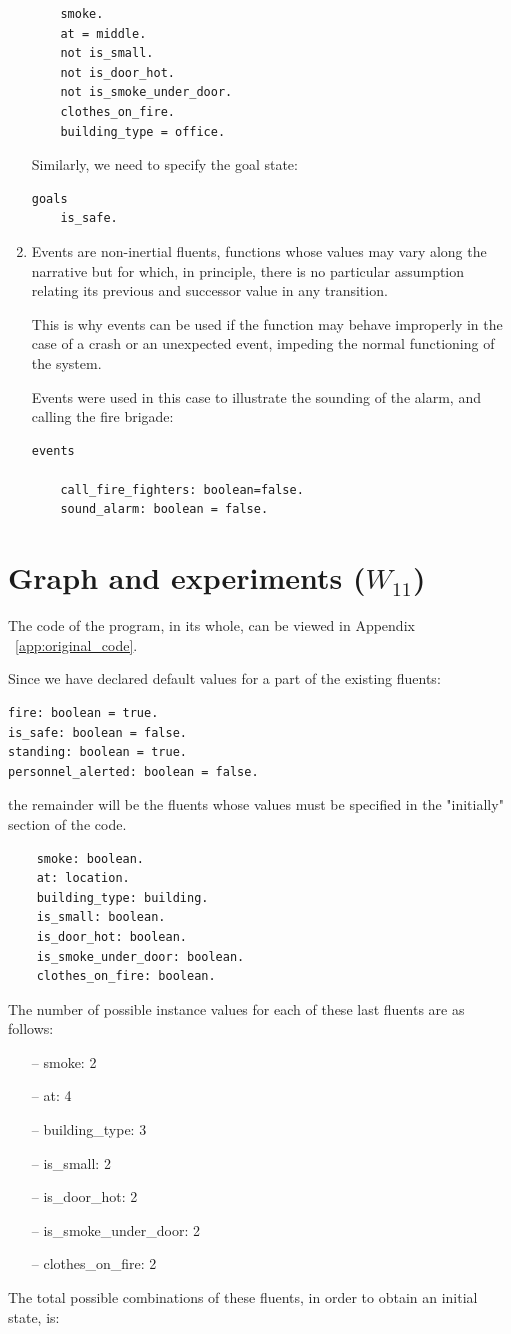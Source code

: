 \documentclass[a4paper,12pt]{report}
\begin{document}
\begin{enumerate}
\begin{verbatim}
	smoke.
	at = middle.
	not is_small.
	not is_door_hot.
	not is_smoke_under_door.
	clothes_on_fire.
	building_type = office.
\end{verbatim}

Similarly, we need to specify the goal state:
\begin{verbatim}
goals
	is_safe.
\end{verbatim}


\item {\color{Red} Events} are non-inertial fluents, functions whose values may vary along the narrative but for which, in principle, there is no particular assumption relating its previous and successor value in any transition. 

This is why events can be used if the function may behave improperly in the case of a crash or an unexpected event, impeding the normal functioning of the system.

Events were used in this case to illustrate the sounding of the alarm, and calling the fire brigade:
\begin{verbatim}
events 

	call_fire_fighters: boolean=false.
	sound_alarm: boolean = false.
\end{verbatim}


\end{enumerate}


\chapter{Graph and experiments ($W_{11}$)}

 The code of the program, in its whole, can be viewed in Appendix ~\ref{app:original_code}.

Since we have declared default values for a part of the existing fluents:
\begin{verbatim}
fire: boolean = true.
is_safe: boolean = false.
standing: boolean = true.
personnel_alerted: boolean = false.
\end{verbatim}
the remainder will be the fluents whose values must be specified in the "initially" section of the code.
\begin{verbatim}
	smoke: boolean.
	at: location.
	building_type: building.
	is_small: boolean.
	is_door_hot: boolean.
	is_smoke_under_door: boolean.
	clothes_on_fire: boolean.
\end{verbatim}

The number of possible instance values for each of these last fluents are as follows: 
\begin{itemize}
\item[--] smoke: 2
\item[--] at: 4
\item[--] building\_type: 3
\item[--] is\_small: 2
\item[--] is\_door\_hot: 2
\item[--] is\_smoke\_under\_door: 2
\item[--] clothes\_on\_fire: 2
\end{itemize}
The total possible combinations of these fluents, in order to obtain an initial state, is:
\end{document}
